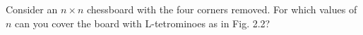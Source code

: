 Consider an $n \times n$ chessboard with the four corners removed. For which values of $n$ can you cover the board with L-tetrominoes as in Fig. 2.2?
